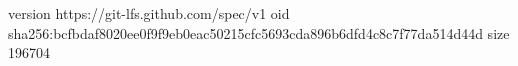 version https://git-lfs.github.com/spec/v1
oid sha256:bcfbdaf8020ee0f9f9eb0eac50215cfc5693cda896b6dfd4c8c7f77da514d44d
size 196704
